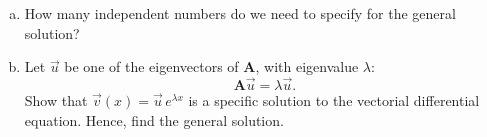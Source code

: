 \documentclass[10pt,a4paper]{article}
\begin{document}
\begin{enumerate}
  \begin{enumerate}[(a)]
  \item
    How many independent numbers do we need to specify for the general
    solution?

  \item
    Let $\vec{u}$ be one of the eigenvectors of $\mathbf{A}$, with
    eigenvalue $\lambda$:
    \begin{equation}
      \mathbf{A} \vec{u} = \lambda \vec{u}.
    \end{equation}
    Show that $\vec{v}(x) = \vec{u}\, e^{\lambda x}$ is a specific
    solution to the vectorial differential equation. Hence, find the
    general solution.
  \end{enumerate}
\end{enumerate}


    
    
\end{document}
